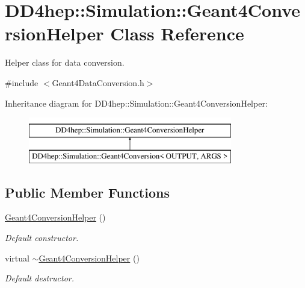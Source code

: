 \hypertarget{class_d_d4hep_1_1_simulation_1_1_geant4_conversion_helper}{}\section{D\+D4hep\+:\+:Simulation\+:\+:Geant4\+Conversion\+Helper Class Reference}
\label{class_d_d4hep_1_1_simulation_1_1_geant4_conversion_helper}


Helper class for data conversion.  




{\ttfamily \#include $<$Geant4\+Data\+Conversion.\+h$>$}

Inheritance diagram for D\+D4hep\+:\+:Simulation\+:\+:Geant4\+Conversion\+Helper\+:\begin{figure}[H]
\begin{center}
\leavevmode
\includegraphics[height=2.000000cm]{class_d_d4hep_1_1_simulation_1_1_geant4_conversion_helper}
\end{center}
\end{figure}
\subsection*{Public Member Functions}
\begin{DoxyCompactItemize}
\item 
\hyperlink{class_d_d4hep_1_1_simulation_1_1_geant4_conversion_helper_a58610a40f83c77313587b7eb8eddcd40}{Geant4\+Conversion\+Helper} ()
\begin{DoxyCompactList}\small\item\em Default constructor. \end{DoxyCompactList}\item 
virtual \hyperlink{class_d_d4hep_1_1_simulation_1_1_geant4_conversion_helper_ae69165a68948c43f52a9ef1f30b29ec0}{$\sim$\+Geant4\+Conversion\+Helper} ()
\begin{DoxyCompactList}\small\item\em Default destructor. \end{DoxyCompactList}\end{DoxyCompactItemize}
